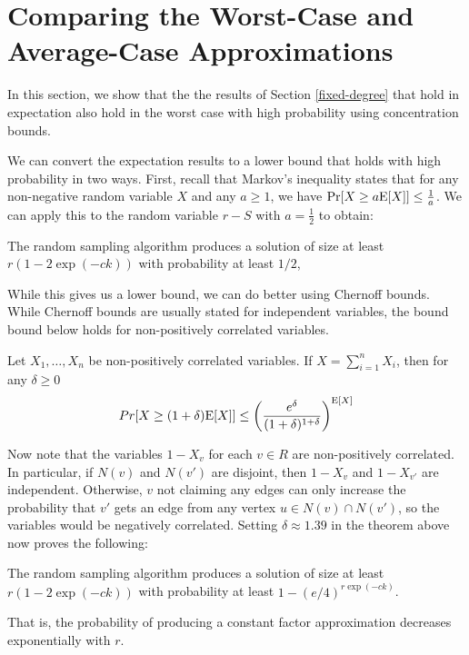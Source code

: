 \section{Comparing the Worst-Case and Average-Case Approximations}
In this section, we show that the the results of Section
\ref{fixed-degree} that hold in expectation also hold in the worst
case with high probability using concentration bounds.

We can convert the expectation results to a lower bound that holds
with high probability in two ways. First, recall that Markov's
inequality states that for any non-negative random variable $X$ and
any $a\geq 1$, we have $\Pr[X \geq a\text{E}[X]] \leq \frac{1}{a}$. We can
apply this to the random variable $r-S$ with $a=\frac{1}{2}$ to
obtain:

\begin{thm}
The random sampling algorithm produces a solution of size at least $r(1-2\exp(-ck))$ with probability at least $1/2$, 
\end{thm}

While this gives us a lower bound, we can do better using Chernoff
bounds. While Chernoff bounds are usually stated for independent
variables, the bound bound below holds for non-positively correlated
variables.

\begin{thm}
Let $X_1,\ldots, X_n$ be non-positively correlated variables. If $X=\sum_{i=1}^n X_i$, then for any $\delta\geq 0$
\[ Pr[X \geq (1+\delta)\text{E}[X] ] \leq \left(\frac{e^\delta}{(1+\delta)^{1+\delta}}\right)^{\text{E}[X]} \]
\end{thm}

Now note that the variables $1-X_v$ for each $v\in R$ are
non-positively correlated. In particular, if $N(v)$ and $N(v')$ are
disjoint, then $1-X_v$ and $1-X_{v'}$ are independent. Otherwise, $v$
not claiming any edges can only increase the probability that $v'$
gets an edge from any vertex $u\in N(v)\cap N(v')$, so the variables
would be negatively correlated. Setting $\delta\approx 1.39$ in the
theorem above now proves the following:

\begin{thm}
The random sampling algorithm produces a solution of size at least $r(1-2\exp(-ck))$ with probability at least $1-(e/4)^{r\exp(-ck)}$.
\end{thm}

That is, the probability of producing a constant factor approximation decreases exponentially with $r$.

